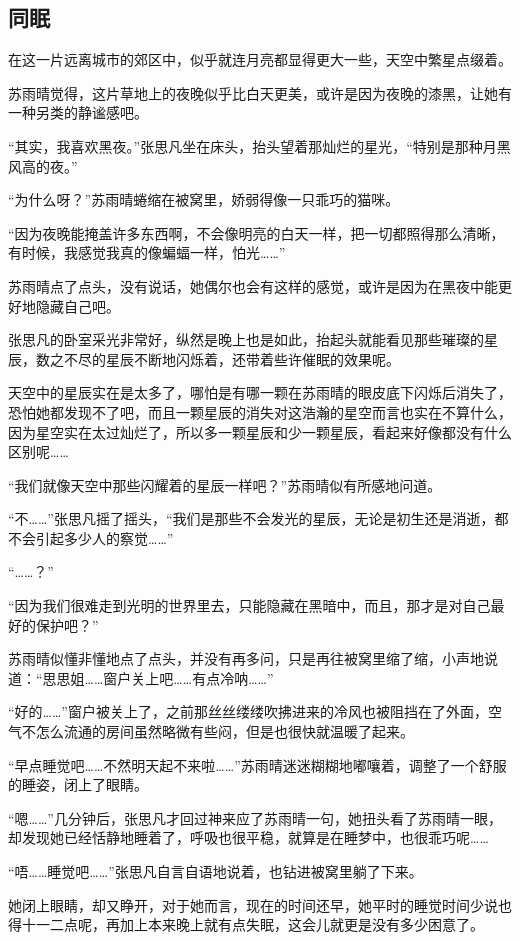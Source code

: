 \subsection{同眠}

在这一片远离城市的郊区中，似乎就连月亮都显得更大一些，天空中繁星点缀着。

苏雨晴觉得，这片草地上的夜晚似乎比白天更美，或许是因为夜晚的漆黑，让她有一种另类的静谧感吧。

“其实，我喜欢黑夜。”张思凡坐在床头，抬头望着那灿烂的星光，“特别是那种月黑风高的夜。”

“为什么呀？”苏雨晴蜷缩在被窝里，娇弱得像一只乖巧的猫咪。

“因为夜晚能掩盖许多东西啊，不会像明亮的白天一样，把一切都照得那么清晰，有时候，我感觉我真的像蝙蝠一样，怕光……”

苏雨晴点了点头，没有说话，她偶尔也会有这样的感觉，或许是因为在黑夜中能更好地隐藏自己吧。

张思凡的卧室采光非常好，纵然是晚上也是如此，抬起头就能看见那些璀璨的星辰，数之不尽的星辰不断地闪烁着，还带着些许催眠的效果呢。

天空中的星辰实在是太多了，哪怕是有哪一颗在苏雨晴的眼皮底下闪烁后消失了，恐怕她都发现不了吧，而且一颗星辰的消失对这浩瀚的星空而言也实在不算什么，因为星空实在太过灿烂了，所以多一颗星辰和少一颗星辰，看起来好像都没有什么区别呢……

“我们就像天空中那些闪耀着的星辰一样吧？”苏雨晴似有所感地问道。

“不……”张思凡摇了摇头，“我们是那些不会发光的星辰，无论是初生还是消逝，都不会引起多少人的察觉……”

“……？”

“因为我们很难走到光明的世界里去，只能隐藏在黑暗中，而且，那才是对自己最好的保护吧？”

苏雨晴似懂非懂地点了点头，并没有再多问，只是再往被窝里缩了缩，小声地说道：“思思姐……窗户关上吧……有点冷呐……”

“好的……”窗户被关上了，之前那丝丝缕缕吹拂进来的冷风也被阻挡在了外面，空气不怎么流通的房间虽然略微有些闷，但是也很快就温暖了起来。

“早点睡觉吧……不然明天起不来啦……”苏雨晴迷迷糊糊地嘟嚷着，调整了一个舒服的睡姿，闭上了眼睛。

“嗯……”几分钟后，张思凡才回过神来应了苏雨晴一句，她扭头看了苏雨晴一眼，却发现她已经恬静地睡着了，呼吸也很平稳，就算是在睡梦中，也很乖巧呢……

“唔……睡觉吧……”张思凡自言自语地说着，也钻进被窝里躺了下来。

她闭上眼睛，却又睁开，对于她而言，现在的时间还早，她平时的睡觉时间少说也得十一二点呢，再加上本来晚上就有点失眠，这会儿就更是没有多少困意了。

